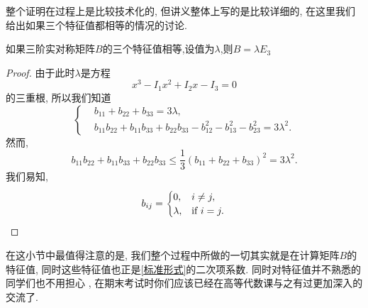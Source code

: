 \documentclass[./main.tex]{subfiles}
\begin{document}
整个证明在过程上是比较技术化的, 但讲义整体上写的是比较详细的, 在这里我们给出如果三个特征值都相等的情况的讨论. 
\begin{proposition}
    如果三阶实对称矩阵$B$的三个特征值相等,设值为$\lambda$,则$B=\lambda E_3$
\end{proposition}
\begin{proof}
    由于此时$\lambda$是方程
    \[
    x^3-I_1x^2+I_2x-I_3=0
    \]
    的三重根, 所以我们知道
\[
    \left\{
    \begin{aligned}
        &b_{11}+b_{22}+b_{33}=3\lambda,\\
        &b_{11}b_{22}+b_{11}b_{33}+b_{22}b_{33}-b_{12}^2-b_{13}^2-b_{23}^2=3\lambda^2.
    \end{aligned}
    \right.
\]
然而, 
\[b_{11}b_{22}+b_{11}b_{33}+b_{22}b_{33}\leq \frac{1}{3}
(b_{11}+b_{22}+b_{33})^2=3\lambda^2.\]
我们易知, \[b_{ij}=
\begin{cases}
    0,&  i\neq j,\\
    \lambda,& \text{if } i=j.
\end{cases}\qedhere
\]
\end{proof}
在这小节中最值得注意的是, 我们整个过程中所做的一切其实就是在计算矩阵$B$的特征值, 
同时这些特征值也正是\eqref{标准形式}的二次项系数. 同时对特征值并不熟悉的同学们也不用担心
, 在期末考试时你们应该已经在高等代数课与之有过更加深入的交流了. 
\end{document}
